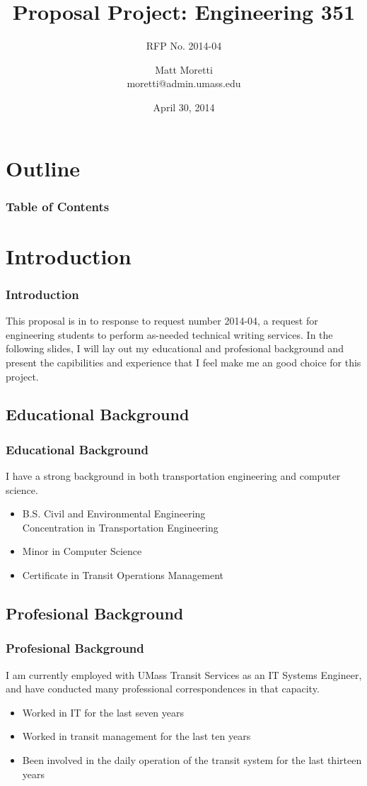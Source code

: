 \documentclass{beamer}
\title{Proposal Project: Engineering 351}
\subtitle{RFP No. 2014-04}
\author{Matt Moretti \\
        moretti@admin.umass.edu}
\institute{ENGIN 351 \\
           University of Massachusetts}
\date{April 30, 2014}
\begin{document}
\frame{\titlepage}

\section*{Outline}
\begin{frame}
  \frametitle{Table of Contents}
  \tableofcontents
\end{frame}

\section{Introduction}
\begin{frame}
  \frametitle{Introduction}
  This proposal is in to response to request number 2014-04, a request for
  engineering students to perform as-needed technical writing services.  In
  the following slides, I will lay out my educational and profesional
  background and present the capibilities and experience that I feel make me
  an good choice for this project.
\end{frame}

\subsection{Educational Background}
\begin{frame}
  \frametitle{Educational Background}

  I have a strong background in both transportation engineering and computer
  science.

  \begin{itemize}
    \item B.S. Civil and Environmental Engineering \\
      Concentration in Transportation Engineering
    \item Minor in Computer Science
    \item Certificate in Transit Operations Management
  \end{itemize}
\end{frame}

\subsection{Profesional Background}
\begin{frame}
  \frametitle{Profesional Background}

  I am currently employed with UMass Transit Services as an IT Systems Engineer,
  and have conducted many professional correspondences in that capacity.

  \begin{itemize}
    \item Worked in IT for the last seven years
    \item Worked in transit management for the last ten years
    \item Been involved in the daily operation of the transit system for the
      last thirteen years
  \end{itemize}
\end{frame}
\end{document}
